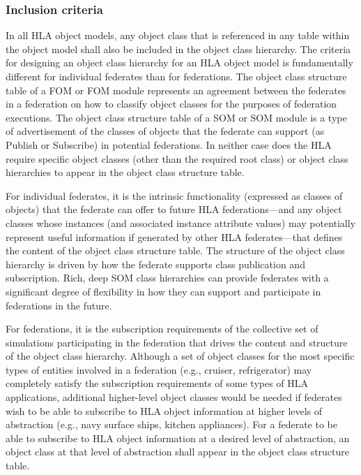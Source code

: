 \subsubsection{Inclusion criteria}
\vspace{4pt}
In all HLA object models, any object class that is referenced in any table within the object model shall also be included in the object class hierarchy. The criteria for designing an object class hierarchy for an HLA object model is fundamentally different for individual federates than for federations. The object class structure table of a FOM or FOM module represents an agreement between the federates in a federation on how to classify object classes for the purposes of federation executions. The object class structure table of a SOM or SOM module is a type of advertisement of the classes of objects that the federate can support (as Publish or Subscribe) in potential federations. In neither case does the HLA require specific object classes (other than the required root class) or object class hierarchies to appear in the object class structure table.

\newpage
For individual federates, it is the intrinsic functionality (expressed as classes of objects) that the federate can offer to future HLA federations---and any object classes whose instances (and associated instance attribute values) may potentially represent useful information if generated by other HLA federates---that defines the content of the object class structure table. The structure of the object class hierarchy is driven by how the federate supports class publication and subscription. Rich, deep SOM class hierarchies can provide federates with a significant degree of flexibility in how they can support and participate in federations in the future.

For federations, it is the subscription requirements of the collective set of simulations participating in the federation that drives the content and structure of the object class hierarchy. Although a set of object classes for the most specific types of entities involved in a federation (e.g., cruiser, refrigerator) may completely satisfy the subscription requirements of some types of HLA applications, additional higher-level object classes would be needed if federates wish to be able to subscribe to HLA object information at higher levels of abstraction (e.g., navy surface ships, kitchen appliances). For a federate to be able to subscribe to HLA object information at a desired level of abstraction, an object class at that level of abstraction shall appear in the object class structure table.

